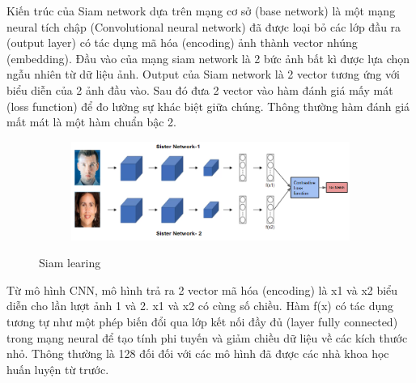 Kiến trúc của Siam network dựa trên mạng cơ sở (base network) là một mạng neural tích chập (Convolutional neural network)
đã được loại bỏ các lớp đầu ra (output layer) có tác dụng mã hóa (encoding) ảnh thành vector nhúng (embedding).
Đầu vào của mạng siam network là 2 bức ảnh bất kì được lựa chọn ngẫu nhiên từ dữ liệu ảnh.
Output của Siam network là 2 vector tương ứng với biểu diễn của 2 ảnh đầu vào.
Sau đó đưa 2 vector vào hàm đánh giá mấy mát (loss function) để đo lường sự khác biệt giữa chúng.
Thông thường hàm đánh giá mất mát là một hàm chuẩn bậc 2.

\begin{figure}
    \begin{subfigure}{1.\textwidth}
        \begin{center}
            \includegraphics[width=1.\linewidth]{Chapters/items/chap2_16.jpg}
        \end{center}
        \label{fig: chap2_16}
    \end{subfigure}
    \caption{Siam learing}
\end{figure}

\newpage
Từ mô hình CNN, mô hình trả ra 2 vector mã hóa (encoding) là x1 và x2
biểu diễn cho lần lượt ảnh 1 và 2. x1 và x2 có cùng số chiều.
Hàm f(x) có tác dụng tương tự như một phép biến đổi qua lớp kết nối đầy đủ (layer fully connected)
trong mạng neural để tạo tính phi tuyến và giảm chiều dữ liệu về các kích thước nhỏ.
Thông thường là 128 đối đối với các mô hình đã được các nhà khoa học huấn luyện từ trước.

